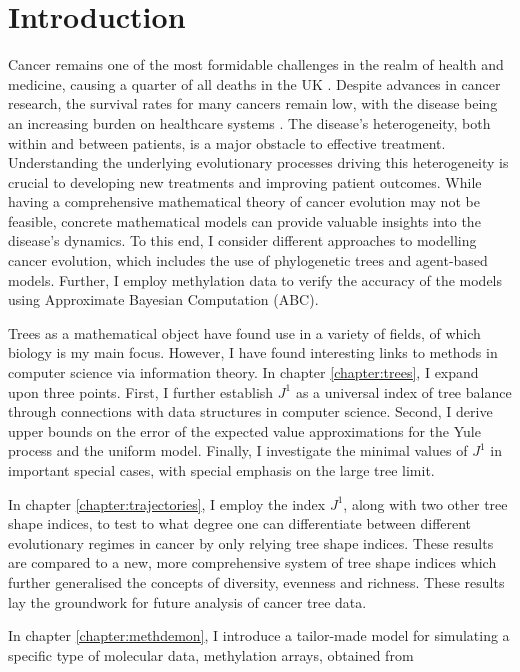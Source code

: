\chapter{Introduction}\label{chapter:introduction}
Cancer remains one of the most formidable challenges in the realm of health and medicine, causing a quarter of all deaths in the UK \cite{noauthor_cancer_2015}.
Despite advances in cancer research, the survival rates for many cancers remain low, with the disease being an increasing burden on healthcare
systems \cite{noauthor_financial_nodate}. The disease's heterogeneity, both within and between patients, is a major obstacle to effective treatment. Understanding the
underlying evolutionary processes driving this heterogeneity is crucial to developing new treatments and improving patient outcomes.
While having a comprehensive mathematical theory of cancer evolution may not be feasible, concrete mathematical models can provide valuable insights into the
disease's dynamics. To this end, I consider different approaches to modelling cancer evolution, which includes the use of phylogenetic
trees and agent-based models. Further, I employ methylation data to verify the accuracy of the models using Approximate Bayesian Computation (ABC).\par
Trees as a mathematical object have found use in a variety of fields, of which biology is my main focus. However, I have found
interesting links to methods in computer science via information theory.
In chapter \ref{chapter:trees}, I expand upon three points. First, I further establish $J^1$ as a
universal index of tree balance through connections with data structures in computer science. Second, I derive
upper bounds on the error of the expected value approximations for the Yule process and the uniform model.
Finally, I investigate the minimal values of $J^1$ in important special cases,
with special emphasis on the large tree limit. \par
In chapter \ref{chapter:trajectories}, I employ the index $J^1$, along with two other tree shape indices, to
test to what degree one can differentiate between different evolutionary regimes in cancer by only relying
tree shape indices. These results are compared to a new, more comprehensive system of tree shape indices \cite{noble_new_2023}
which further generalised the concepts of diversity, evenness and richness. These results lay the groundwork for
future analysis of cancer tree data.\par
In chapter \ref{chapter:methdemon}, I introduce a tailor-made model for simulating a specific type of molecular data, methylation arrays, obtained from

